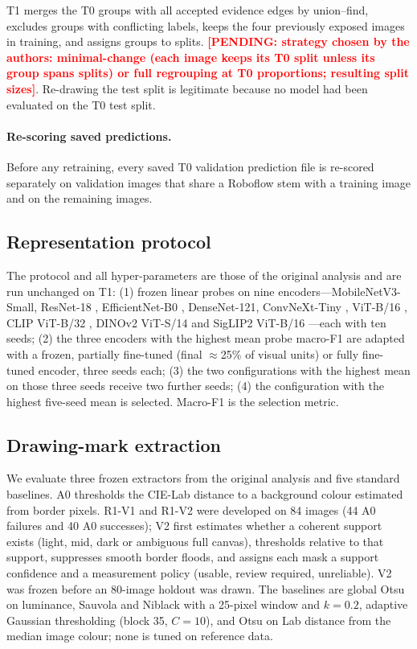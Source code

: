 \documentclass[pdflatex,sn-mathphys-num]{sn-jnl}
\newcommand{\pending}[1]{\textcolor{red}{\textbf{[PENDING: #1]}}}
\begin{document}
T1 merges the T0 groups with all accepted evidence edges by union--find, excludes groups with conflicting labels, keeps the four previously exposed images in training, and assigns groups to splits. \pending{strategy chosen by the authors: minimal-change (each image keeps its T0 split unless its group spans splits) or full regrouping at T0 proportions; resulting split sizes}. Re-drawing the test split is legitimate because no model had been evaluated on the T0 test split.

\paragraph{Re-scoring saved predictions.} Before any retraining, every saved T0 validation prediction file is re-scored separately on validation images that share a Roboflow stem with a training image and on the remaining images.

\subsection{Representation protocol}\label{sec:m-rep}
The protocol and all hyper-parameters are those of the original analysis and are run unchanged on T1: (1) frozen linear probes on nine encoders---MobileNetV3-Small, ResNet-18 \cite{he2016resnet}, EfficientNet-B0 \cite{tan2019efficientnet}, DenseNet-121, ConvNeXt-Tiny \cite{liu2022convnext}, ViT-B/16 \cite{dosovitskiy2021vit}, CLIP ViT-B/32 \cite{radford2021clip}, DINOv2 ViT-S/14 \cite{oquab2024dinov2} and SigLIP2 ViT-B/16 \cite{tschannen2025siglip2}---each with ten seeds; (2) the three encoders with the highest mean probe macro-F1 are adapted with a frozen, partially fine-tuned (final $\approx$25\% of visual units) or fully fine-tuned encoder, three seeds each; (3) the two configurations with the highest mean on those three seeds receive two further seeds; (4) the configuration with the highest five-seed mean is selected. Macro-F1 is the selection metric.

\subsection{Drawing-mark extraction}\label{sec:m-fg}
We evaluate three frozen extractors from the original analysis and five standard baselines. A0 thresholds the CIE-Lab distance to a background colour estimated from border pixels. R1-V1 and R1-V2 were developed on 84 images (44 A0 failures and 40 A0 successes); V2 first estimates whether a coherent support exists (light, mid, dark or ambiguous full canvas), thresholds relative to that support, suppresses smooth border floods, and assigns each mask a support confidence and a measurement policy (usable, review required, unreliable). V2 was frozen before an 80-image holdout was drawn. The baselines are global Otsu \cite{otsu1979threshold} on luminance, Sauvola \cite{sauvola2000adaptive} and Niblack \cite{niblack1986introduction} with a 25-pixel window and $k=0.2$, adaptive Gaussian thresholding (block 35, $C=10$), and Otsu on Lab distance from the median image colour; none is tuned on reference data.
\end{document}
